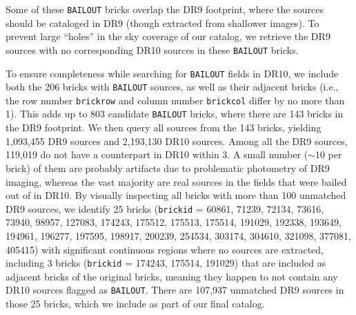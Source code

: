 \documentclass[twocolumn,tighten]{aastex631}
\newcommand{\dr}[1]{DR{#1}}
\begin{document}
\begin{CJK*}{UTF8}{gbsn}
Some of these \texttt{BAILOUT} bricks overlap the \dr{9} footprint, where the sources should be cataloged in \dr{9} (though extracted from shallower images). To prevent large ``holes'' in the sky coverage of our catalog, we retrieve the \dr{9} sources with no corresponding \dr{10} sources in these \texttt{BAILOUT} bricks. 

To ensure completeness while searching for \texttt{BAILOUT} fields in \dr{10}, we include both the 206 bricks with \texttt{BAILOUT} sources, as well as their adjacent bricks (i.e., the row number \texttt{brickrow} and column number \texttt{brickcol} differ by no more than 1). This adds up to 803 candidate \texttt{BAILOUT} bricks, where there are 143 bricks in the \dr{9} footprint. We then query all sources from the 143 bricks, yielding 1,093,455 \dr{9} sources and 2,193,130 \dr{10} sources. Among all the \dr{9} sources, 119,019 do not have a counterpart in \dr{10} within 3. A small number ($\sim$$10$ per brick) of them are probably artifacts due to problematic photometry of \dr{9} imaging, whereas the vast majority are real sources in the fields that were bailed out of in \dr{10}. By visually inspecting all bricks with more than 100 unmatched \dr{9} sources, we identify 25 bricks (\texttt{brickid} = 60861,  71239,  72134,  73616,  73940,  98957, 127083, 174243, 175512, 175513, 175514, 191029, 192338, 193649, 194961, 196277, 197595, 198917, 200239, 254534, 303174, 304610, 321098, 377081,
405415) with significant continuous regions where no sources are extracted, including 3 bricks (\texttt{brickid} = 174243, 175514, 191029) that are included as adjacent bricks of the original bricks, meaning they happen to not contain any \dr{10} sources flagged as \texttt{BAILOUT}. There are 107,937 unmatched \dr{9} sources in those 25 bricks, which we include as part of our final catalog. %






\end{CJK*}
\end{document}
